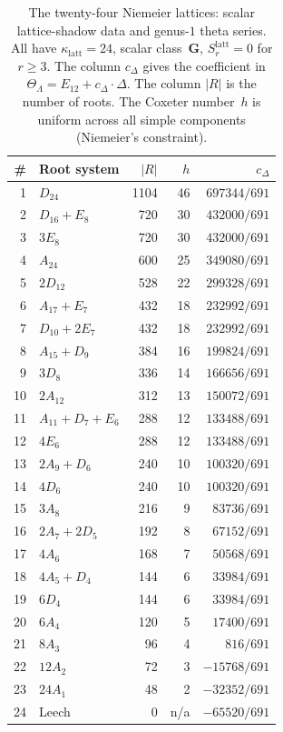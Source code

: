 \begin{table}[p]
\centering
\caption{The twenty-four Niemeier lattices: scalar lattice-shadow data
and genus-$1$ theta series. All have
$\kappa_{\mathrm{latt}} = 24$, scalar class~$\mathbf{G}$,
$S_r^{\mathrm{latt}} = 0$ for $r \geq 3$.
The column $c_\Delta$ gives the coefficient in
$\Theta_\Lambda = E_{12} + c_\Delta \cdot \Delta$.
The column $|R|$ is the number of roots.
The Coxeter number~$h$ is uniform across all simple
components (Niemeier's constraint).}
\label{tab:niemeier-shadow-atlas}
\begin{tabular}{r l r r r}
\toprule
\# & Root system & $|R|$ & $h$ & $c_\Delta$ \\
\midrule
1 & $D_{24}$ & 1104 & 46 & $697344/691$ \\
2 & $D_{16}{+}E_8$ & 720 & 30 & $432000/691$ \\
3 & $3E_8$ & 720 & 30 & $432000/691$ \\
4 & $A_{24}$ & 600 & 25 & $349080/691$ \\
5 & $2D_{12}$ & 528 & 22 & $299328/691$ \\
6 & $A_{17}{+}E_7$ & 432 & 18 & $232992/691$ \\
7 & $D_{10}{+}2E_7$ & 432 & 18 & $232992/691$ \\
8 & $A_{15}{+}D_9$ & 384 & 16 & $199824/691$ \\
9 & $3D_8$ & 336 & 14 & $166656/691$ \\
10 & $2A_{12}$ & 312 & 13 & $150072/691$ \\
11 & $A_{11}{+}D_7{+}E_6$ & 288 & 12 & $133488/691$ \\
12 & $4E_6$ & 288 & 12 & $133488/691$ \\
13 & $2A_9{+}D_6$ & 240 & 10 & $100320/691$ \\
14 & $4D_6$ & 240 & 10 & $100320/691$ \\
15 & $3A_8$ & 216 & 9 & $83736/691$ \\
16 & $2A_7{+}2D_5$ & 192 & 8 & $67152/691$ \\
17 & $4A_6$ & 168 & 7 & $50568/691$ \\
18 & $4A_5{+}D_4$ & 144 & 6 & $33984/691$ \\
19 & $6D_4$ & 144 & 6 & $33984/691$ \\
20 & $6A_4$ & 120 & 5 & $17400/691$ \\
21 & $8A_3$ & 96 & 4 & $816/691$ \\
22 & $12A_2$ & 72 & 3 & $-15768/691$ \\
23 & $24A_1$ & 48 & 2 & $-32352/691$ \\
24 & Leech & 0 & n/a & $-65520/691$ \\
\bottomrule
\end{tabular}
\end{table}

